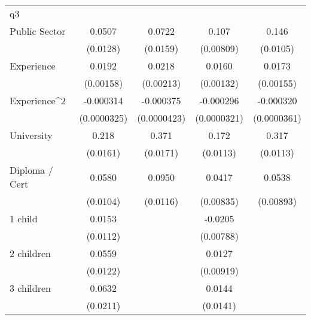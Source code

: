 {\begin{tabular}{l*{4}{c}}
\hline
q3                  &                     &                     &                     &                     \\
Public Sector       &      0.0507\sym{***}&      0.0722\sym{***}&       0.107\sym{***}&       0.146\sym{***}\\
                    &    (0.0128)         &    (0.0159)         &   (0.00809)         &    (0.0105)         \\
[1em]
Experience          &      0.0192\sym{***}&      0.0218\sym{***}&      0.0160\sym{***}&      0.0173\sym{***}\\
                    &   (0.00158)         &   (0.00213)         &   (0.00132)         &   (0.00155)         \\
[1em]
Experience^{2}      &   -0.000314\sym{***}&   -0.000375\sym{***}&   -0.000296\sym{***}&   -0.000320\sym{***}\\
                    & (0.0000325)         & (0.0000423)         & (0.0000321)         & (0.0000361)         \\
[1em]
University          &       0.218\sym{***}&       0.371\sym{***}&       0.172\sym{***}&       0.317\sym{***}\\
                    &    (0.0161)         &    (0.0171)         &    (0.0113)         &    (0.0113)         \\
[1em]
Diploma / Cert      &      0.0580\sym{***}&      0.0950\sym{***}&      0.0417\sym{***}&      0.0538\sym{***}\\
                    &    (0.0104)         &    (0.0116)         &   (0.00835)         &   (0.00893)         \\
[1em]
1 child             &      0.0153         &                     &     -0.0205\sym{**} &                     \\
                    &    (0.0112)         &                     &   (0.00788)         &                     \\
[1em]
2 children          &      0.0559\sym{***}&                     &      0.0127         &                     \\
                    &    (0.0122)         &                     &   (0.00919)         &                     \\
[1em]
3 children          &      0.0632\sym{**} &                     &      0.0144         &                     \\
                    &    (0.0211)         &                     &    (0.0141)         &                     \\

\end{tabular}}
